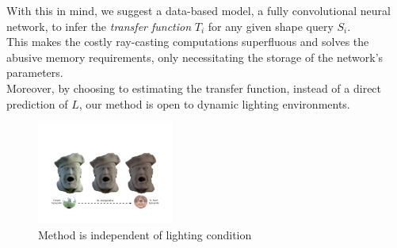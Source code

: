 With this in mind, we suggest a data-based model, a fully convolutional neural network, to infer the \textit{transfer function} $T_i$ for any given shape query $S_i$. \\
This makes the costly ray-casting computations superfluous and solves the abusive memory requirements, only necessitating the storage of the network's parameters. \\
Moreover, by choosing to estimating the transfer function, instead of a direct prediction of $L$, our method is open to  dynamic lighting environments.
\begin{figure}[H]
  \centering
    \includegraphics[width=0.4\textwidth]{Figures/varying_lighting}
     \caption{Method is independent of lighting condition}
     \label{Fig: Varying lighting}
\end{figure}
